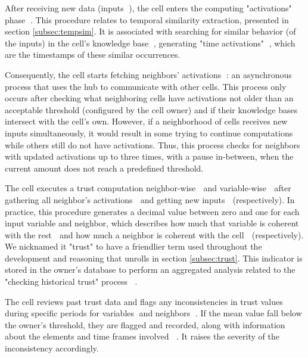 After receiving new data (inputs \textcircled{}), the cell enters the computing "activations" phase \textcircled{}. This procedure relates to temporal similarity extraction, presented in section \ref{subsec:tempsim}. It is associated with searching for similar behavior (of the inputs) in the cell's knowledge base \textcircled{}, generating "time activations" \textcircled{}, which are the timestamps of these similar occurrences.

Consequently, the cell starts fetching neighbors' activations \textcircled{}: an asynchronous process that uses the hub to communicate with other cells. This process only occurs after checking what neighboring cells have activations not older than an acceptable threshold (configured by the cell owner) and if their knowledge bases intersect with the cell's own. However, if a neighborhood of cells receives new inputs simultaneously, it would result in some trying to continue computations while others still do not have activations. Thus, this process checks for neighbors with updated activations up to three times, with a pause in-between, when the current amount does not reach a predefined threshold.

The cell executes a trust computation neighbor-wise \textcircled{} and variable-wise \textcircled{} after gathering all neighbor's activations \textcircled{} and getting new inputs \textcircled{} (respectively). In practice, this procedure generates a decimal value between zero and one for each input variable and neighbor, which describes how much that variable is coherent with the rest \textcircled{} and how much a neighbor is coherent with the cell \textcircled{} (respectively). We nicknamed it "trust" to have a friendlier term used throughout the development and reasoning that unrolls in section \ref{subsec:trust}. This indicator is stored in the owner's database to perform an aggregated analysis related to the "checking historical trust" process \textcircled{}\textcircled{}.

The cell reviews past trust data and flags any inconsistencies in trust values during specific periods for variables \textcircled{}and neighbors \textcircled{}. If the mean value fall below the owner's threshold, they are flagged and recorded, along with information about the elements and time frames involved \textcircled{}\textcircled{}. It raises the severity of the inconsistency accordingly.


